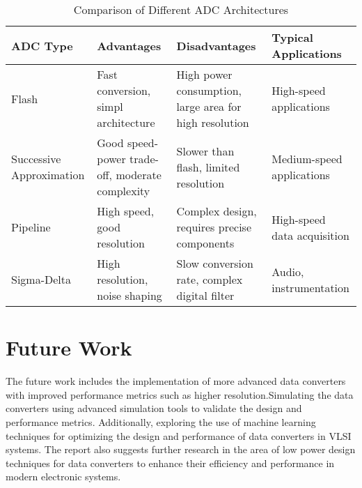 \begin{table}[h!]
\centering
\begin{tabular}{|p{2.8cm}|p{3.5cm}|p{3.8cm}|p{3.2cm}|}
\hline
\textbf{ADC Type} & \textbf{Advantages} & \textbf{Disadvantages} & \textbf{Typical Applications} \\
\hline
Flash & Fast conversion, simpl architecture & High power consumption, large area for high resolution & High-speed applications \\
\hline
Successive Approximation & Good speed-power trade-off, moderate complexity & Slower than flash, limited resolution & Medium-speed applications \\
\hline
Pipeline & High speed, good resolution & Complex design, requires precise components & High-speed data acquisition \\
\hline
Sigma-Delta & High resolution, noise shaping & Slow conversion rate, complex digital filter & Audio, instrumentation \\
\hline
\end{tabular}
\caption{Comparison of Different ADC Architectures}
\label{tab:adc_comparison}
\end{table}

\section{Future Work}
The future work includes the implementation of more advanced data converters with improved performance metrics such as higher resolution.Simulating the data converters using advanced simulation tools to validate the design and performance metrics. Additionally, exploring the use of machine learning techniques for optimizing the design and performance of data converters in VLSI systems. The report also suggests further research in the area of low power design techniques for data converters to enhance their efficiency and performance in modern electronic systems.


\nocite{vandeplassche2003cmos}
\nocite{abrial1988analog}
\nocite{schouwenaars1988lowpower}
\nocite{jin2014energyefficient}
\nocite{vandeplassche1982monolithic}
\nocite{baker2010cmos}
\nocite{pelgrom2023analog}
